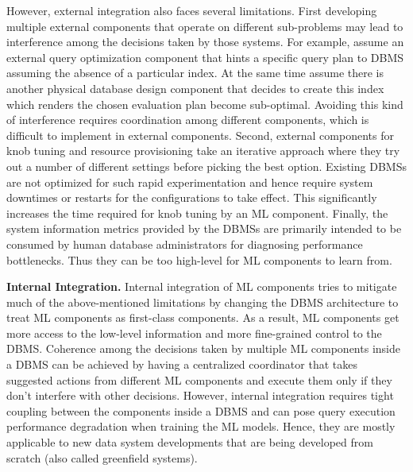 However, external integration also faces several limitations.
First developing multiple external components that operate on different sub-problems may lead to interference among the decisions taken by those systems.
For example, assume an external query optimization component that hints a specific query plan to DBMS assuming the absence of a particular index.
At the same time assume there is another physical database design component that decides to create this index which renders the chosen evaluation plan become sub-optimal.
Avoiding this kind of interference requires coordination among different components, which is difficult to implement in external components.
Second, external components for knob tuning and resource provisioning take an iterative approach where they try out a number of different settings before picking the best option.
Existing DBMSs are not optimized for such rapid experimentation and hence require system downtimes or restarts for the configurations to take effect.
This significantly increases the time required for knob tuning by an ML component.
Finally, the system information metrics provided by the DBMSs are primarily intended to be consumed by human database administrators for diagnosing performance bottlenecks.
Thus they can be too high-level for ML components to learn from.

\vspace{2mm}
\noindent \textbf{Internal Integration.} 
Internal integration of ML components tries to mitigate much of the above-mentioned limitations by changing the DBMS architecture to treat ML components as first-class components.
As a result, ML components get more access to the low-level information and more fine-grained control to the DBMS.
Coherence among the decisions taken by multiple ML components inside a DBMS can be achieved by having a centralized coordinator that takes suggested actions from different ML components and execute them only if they don't interfere with other decisions.
However, internal integration requires tight coupling between the components inside a DBMS and can pose query execution performance degradation when training the ML models.
Hence, they are mostly applicable to new data system developments that are being developed from scratch (also called greenfield systems).

